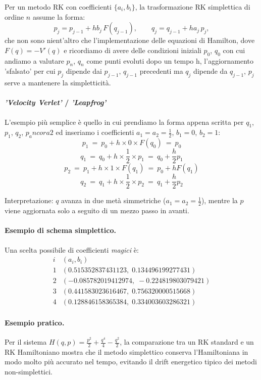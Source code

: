 Per un metodo RK con coefficienti $\{a_i,b_i\}$, la trasformazione RK simplettica di ordine $n$ assume la forma:
\[
p_{j} = p_{j-1} + h b_j\, F(q_{j-1}), \qquad
q_{j} = q_{j-1} + h a_j\, p_j,
\]
che non sono nient'altro che l'implementazione delle equazioni di Hamilton, dove $F(q) = -V'(q)$ e ricordiamo di avere delle condizioni iniziali $p_0$, $q_0$ con cui andiamo a valutare $p_n$, $q_n$ come punti evoluti dopo un tempo h, l'aggiornamento 'sfalsato' per cui $p_{j}$ dipende dai $p_{j-1},\, q_{j-1}$ precedenti ma $q_j$ dipende da $q_{j-1},\, p_j$  serve a mantenere la simpletticità.

\paragraph{\emph{'Velocity Verlet'} / \emph{'Leapfrog'}}
L'esempio più semplice è quello in cui prendiamo la forma appena scritta per $q_1$, $p_1$, $q_2$, $p_ancora2$ ed inseriamo i coefficienti $a_1=a_2=\frac{1}{2}$, $b_1=0$, $b_2=1$:
\[p_1\ =\ p_0 + h \times 0 \times F(q_0)\ =\ p_0\]
\[q_1\ =\ q_0 + h\times \frac{1}{2} \times p_1\ =\ q_0 + \frac{h}{2}p_1\]
\[p_2\ =\ p_1 + h \times 1 \times F(q_1)\ =\ p_0 + hF(q_1) \]
\[q_2\ =\ q_1 + h\times \frac{1}{2} \times p_2\ =\ q_1 + \frac{h}{2}p_2\]

Interpretazione: $q$ avanza in due metà simmetriche ($a_1=a_2=\frac{1}{2}$), mentre la $p$ viene aggiornata solo a seguito di un mezzo passo in avanti.


\paragraph{Esempio di schema simplettico.}
Una scelta possibile di coefficienti \emph{magici} è:
\[
\begin{array}{c|c}
	i & (a_i, b_i) \\
	\hline
	1 & \left(0.515352837431123,\; 0.134496199277431\right)\\
	2 & \left(-0.085782019412974,\; -0.224819803079421\right)\\
	3 & \left(0.441583023616467,\; 0.756320000515668\right)\\
	4 & \left(0.128846158365384,\; 0.334003603286321\right)
\end{array}
\]

\paragraph{Esempio pratico.}
Per il sistema $H(q,p) = \frac{p^2}{2} + \frac{q^4}{4} - \frac{q^2}{2}$,
la comparazione tra un RK standard e un RK Hamiltoniano mostra che il metodo
simplettico conserva l'Hamiltoniana in modo molto più accurato nel tempo,
evitando il drift energetico tipico dei metodi non-simplettici.


